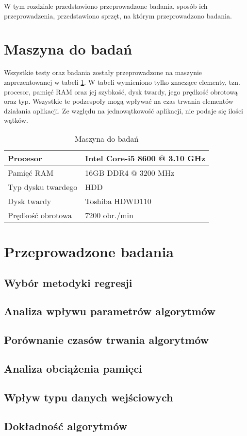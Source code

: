 W tym rozdziale przedstawiono przeprowadzone badania, sposób ich przeprowadzenia, przedstawiono sprzęt, na którym przeprowadzono badania.
\section{Maszyna do badań}
Wszystkie testy oraz badania zostały przeprowadzone na maszynie zaprezentowanej w tabeli \ref{tab:machine}. W tabeli wymieniono tylko znaczące elementy, tzn. procesor, pamięć RAM oraz jej szybkość, dysk twardy, jego prędkość obrotową oraz typ. Wszystkie te podzespoły mogą wpływać na czas trwania elementów działania aplikacji. Ze względu na jednowątkowość aplikacji, nie podaje się ilości wątków.
\begin{table}[H]
    \centering
    \begin{tabular}{|l|l|}
    \hline
    Procesor       & Intel Core-i5 8600 @ 3.10 GHz          \\ \hline
    Pamięć RAM     & 16GB DDR4 @ 3200 MHz \\ \hline
    Typ dysku twardego           & HDD              \\ \hline
    Dysk twardy         & Toshiba HDWD110              \\ \hline
    Prędkość obrotowa         & 7200 obr./min              \\ \hline
    \end{tabular}
    \caption{Maszyna do badań}
    \label{tab:machine}
\end{table}
\section{Przeprowadzone badania}
\subsection{Wybór metodyki regresji}
\label{ssec:regression}
\subsection{Analiza wpływu parametrów algorytmów}
\label{ssec:queryparameters}
\subsection{Porównanie czasów trwania algorytmów}
\label{ssec:times}
\subsection{Analiza obciążenia pamięci}
\label{ssec:memory}
\subsection{Wpływ typu danych wejściowych}
\label{ssec:entrydata}
\subsection{Dokładność algorytmów}